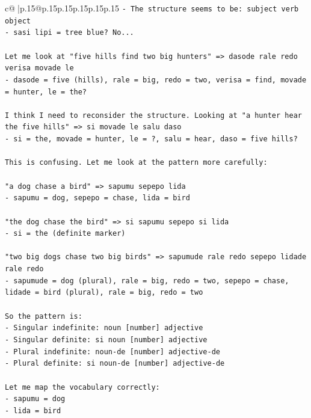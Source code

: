 \documentclass{article}
\begin{document}
{\begin{supertabular}{c@{$\;$}|p{.15\linewidth}@{}p{.15\linewidth}p{.15\linewidth}p{.15\linewidth}p{.15\linewidth}p{.15\linewidth}}
{{{\texttt{{-} The structure seems to be: subject verb object} \\
\texttt{{-} sasi lipi = tree blue? No...} \\
\\ 
\texttt{Let me look at "five hills find two big hunters" => dasode rale redo verisa movade le} \\
\texttt{{-} dasode = five (hills), rale = big, redo = two, verisa = find, movade = hunter, le = the?} \\
\\ 
\texttt{I think I need to reconsider the structure. Looking at "a hunter hear the five hills" => si movade le salu daso} \\
\texttt{{-} si = the, movade = hunter, le = ?, salu = hear, daso = five hills?} \\
\\ 
\texttt{This is confusing. Let me look at the pattern more carefully:} \\
\\ 
\texttt{"a dog chase a bird" => sapumu sepepo lida} \\
\texttt{{-} sapumu = dog, sepepo = chase, lida = bird} \\
\\ 
\texttt{"the dog chase the bird" => si sapumu sepepo si lida} \\
\texttt{{-} si = the (definite marker)} \\
\\ 
\texttt{"two big dogs chase two big birds" => sapumude rale redo sepepo lidade rale redo} \\
\texttt{{-} sapumude = dog (plural), rale = big, redo = two, sepepo = chase, lidade = bird (plural), rale = big, redo = two} \\
\\ 
\texttt{So the pattern is:} \\
\texttt{{-} Singular indefinite: noun {[}number{]} adjective} \\
\texttt{{-} Singular definite: si noun {[}number{]} adjective} \\
\texttt{{-} Plural indefinite: noun{-}de {[}number{]} adjective{-}de} \\
\texttt{{-} Plural definite: si noun{-}de {[}number{]} adjective{-}de} \\
\\ 
\texttt{Let me map the vocabulary correctly:} \\
\texttt{{-} sapumu = dog} \\
\texttt{{-} lida = bird} \\
}}}
\end{supertabular}}
\end{document}
